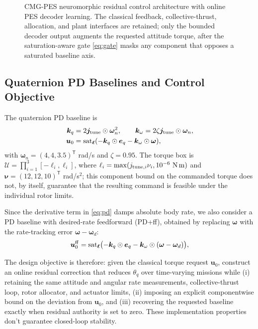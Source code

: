\documentclass[letterpaper, 10 pt, conference]{ieeeconf}
\newcommand{\T}{^{\mathsf T}}
\newcommand{\sat}{\operatorname{sat}}
\providecommand{\DIFaddbeginFL}{} %
\providecommand{\DIFaddendFL}{} %
\providecommand{\DIFdelbeginFL}{} %
\providecommand{\DIFdelendFL}{} %
\providecommand{\DIFscaledelfig}{0.5}
\newlength{\DIFdelgraphicswidth} %
\newlength{\DIFdelgraphicsheight} %
\providecommand{\DIFaddincludegraphics}[2][]{{\color{blue}\fbox{\DIFOincludegraphics[#1]{#2}}}} %
\providecommand{\DIFdelincludegraphics}[2][]{%
\sbox{\DIFdelgraphicsbox}{\DIFOincludegraphics[#1]{#2}}%
\settoboxwidth{\DIFdelgraphicswidth}{\DIFdelgraphicsbox} %
\settoboxtotalheight{\DIFdelgraphicsheight}{\DIFdelgraphicsbox} %
\scalebox{\DIFscaledelfig}{%
\parbox[b]{\DIFdelgraphicswidth}{\usebox{\DIFdelgraphicsbox}\\[-\baselineskip] \rule{\DIFdelgraphicswidth}{0em}}\llap{\resizebox{\DIFdelgraphicswidth}{\DIFdelgraphicsheight}{%
\setlength{\unitlength}{\DIFdelgraphicswidth}%
\begin{picture}(1,1)%
\thicklines\linethickness{2pt} %
{\color[rgb]{1,0,0}\put(0,0){\framebox(1,1){}}}%
{\color[rgb]{1,0,0}\put(0,0){\line( 1,1){1}}}%
{\color[rgb]{1,0,0}\put(0,1){\line(1,-1){1}}}%
\end{picture}%
}\hspace*{3pt}}} %
} %
\DeclareRobustCommand{\DIFaddbeginFL}{\DIFOaddbeginFL \let\includegraphics\DIFaddincludegraphics} %
\DeclareRobustCommand{\DIFaddendFL}{\DIFOaddendFL \let\includegraphics\DIFOincludegraphics} %
\DeclareRobustCommand{\DIFdelbeginFL}{\DIFOdelbeginFL \let\includegraphics\DIFdelincludegraphics} %
\DeclareRobustCommand{\DIFdelendFL}{\DIFOaddendFL \let\includegraphics\DIFOincludegraphics} %
\begin{document}
\begin{figure}[!th]
    \centering
    \DIFdelbeginFL %
\DIFdelendFL \DIFaddbeginFL \resizebox{0.84\textwidth}{!}{}
    \DIFaddendFL \caption{CMG-PES neuromorphic residual control architecture with online PES decoder learning. The classical feedback, collective-thrust, allocation, and plant interfaces are retained; only the bounded decoder output augments the requested attitude torque, after the saturation-aware gate \eqref{eq:gate} masks any component that opposes a saturated baseline axis.}
    \label{fig:arch}
\end{figure}

\subsection{Quaternion PD Baselines and Control Objective}

The quaternion PD baseline is
\begin{align}
 \bm k_q&=2\bm j_{\rm tune}\odot\bm\omega_n^2,\qquad
 \bm k_\omega=2\zeta\bm j_{\rm tune}\odot\bm\omega_n,\\
 \bm u_0&=\sat_{\bm\ell}(-\bm k_q\odot\bm e_q-\bm k_\omega\odot\bm\omega),
 \label{eq:pd}
\end{align}
with $\bm\omega_n=(4,4,3.5)\T$ rad/s and $\zeta=0.95$. The torque box is
$\mathcal U=\prod_{i=1}^3[-\ell_i,\ell_i]$, where
$\ell_i=\max(j_{{\rm tune},i}\nu_i,10^{-6}\ \mathrm{N\,m})$ and
$\bm\nu=(12,12,10)\T$ rad/s$^2$; this component bound on the commanded torque does not, by itself, guarantee that the resulting command is feasible under the individual rotor limits.

Since the derivative term in \eqref{eq:pd} damps absolute body rate,
we also consider a PD baseline with desired-rate feedforward (PD+ff),
obtained by replacing $\bm\omega$ with the rate-tracking error
$\bm\omega-\bm\omega_d$:
\begin{equation}
 \bm u_0^{\rm ff}=\sat_{\bm\ell}\bigl(-\bm k_q\odot\bm e_q-\bm k_\omega\odot(\bm\omega-\bm\omega_d)\bigr),
 \label{eq:pdff}
\end{equation}

The design objective is therefore: given the classical torque request $\bm u_0$, construct an online residual correction that reduces $\theta_q$ over time-varying missions while (i) retaining the same attitude and angular rate measurements, collective-thrust loop, rotor allocator, and actuator limits, (ii) imposing an explicit componentwise bound on the deviation from $\bm u_0$, and (iii) recovering the requested baseline exactly when residual authority is set to zero. These implementation properties don't guarantee closed-loop stability.
\end{document}
